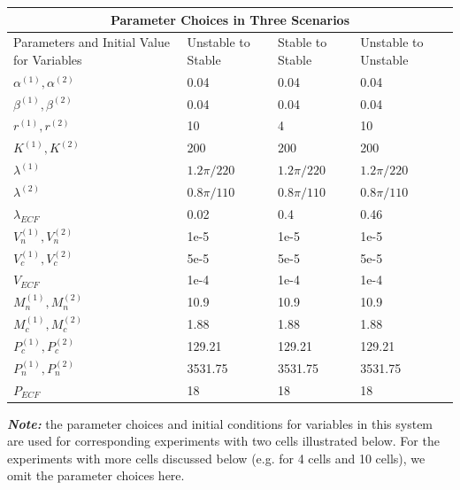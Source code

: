 \documentclass[12pt]{article}
\renewcommand{\(}{\left (}
\renewcommand{\)}{\right )}
\begin{document}
\begin{center}
\begin{tabular}{ |p{4cm}||p{3.5cm}|p{3.5cm}|p{3.8cm}|  }
 \hline
 \multicolumn{4}{|c|}{Parameter Choices in Three Scenarios} \\
 \hline
 Parameters and Initial Value for Variables& Unstable to Stable& Stable to Stable& Unstable to Unstable\\
 \hline
 $\alpha^{(1)}, \alpha^{(2)}$& 0.04 & 0.04 & 0.04\\
 $\beta^{(1)}, \beta^{(2)}$& 0.04 & 0.04 & 0.04\\
 $r^{(1)}, r^{(2)}$& 10 & 4 & 10\\
 $K^{(1)}, K^{(2)}$& 200 & 200 & 200\\
 $\lambda^{(1)}$& ${1.2\pi}/{220}$ & ${1.2\pi}/{220}$  & ${1.2\pi}/{220}$ \\
 $\lambda^{(2)}$& ${0.8\pi}/{110}$ & ${0.8\pi}/{110}$  & ${0.8\pi}/{110}$ \\
 $\lambda_{ECF}$& 0.02 & 0.4 & 0.46 \\
 $V_n^{(1)}, V_n^{(2)}$& 1e-5 & 1e-5& 1e-5\\
 $V_c^{(1)}, V_c^{(2)}$& 5e-5 & 5e-5& 5e-5\\
 $V_{ECF}$& 1e-4 & 1e-4& 1e-4\\
 $M_n^{(1)}, M_n^{(2)}$& 10.9 & 10.9 & 10.9\\
 $M_c^{(1)}, M_c^{(2)}$& 1.88 & 1.88 & 1.88\\
 $P_c^{(1)}, P_c^{(2)}$& 129.21 & 129.21 & 129.21\\
 $P_n^{(1)}, P_n^{(2)}$& 3531.75 & 3531.75 & 3531.75\\
 $P_{ECF}$& 18 & 18 & 18\\
 \hline

\end{tabular}
\end{center}

\vspace{5mm}

\textbf{\textit{Note:}} the parameter choices and initial conditions for variables in this system are used for corresponding experiments with two cells illustrated below. For the experiments with more cells discussed below (e.g. for 4 cells and 10 cells), we omit the parameter choices here.
\end{document}
